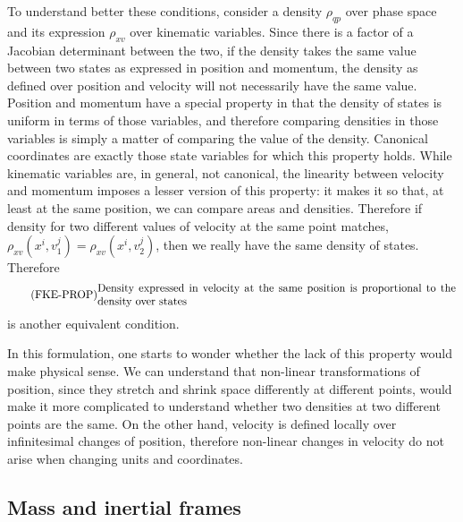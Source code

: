 To understand better these conditions, consider a density $\rho_{qp}$ over phase space and its expression $\rho_{xv}$ over kinematic variables. Since there is a factor of a Jacobian determinant between the two, if the density takes the same value between two states as expressed in position and momentum, the density as defined over position and velocity will not necessarily have the same value. Position and momentum have a special property in that the density of states is uniform in terms of those variables, and therefore comparing densities in those variables is simply a matter of comparing the value of the density. Canonical coordinates are exactly those state variables for which this property holds. While kinematic variables are, in general, not canonical, the linearity between velocity and momentum imposes a lesser version of this property: it makes it so that, at least at the same position, we can compare areas and densities. Therefore if density for two different values of velocity at the same point matches, $\rho_{xv}(x^i, v_1^j) = \rho_{xv}(x^i, v_2^j)$, then we really have the same density of states. Therefore
\begin{equation}
	\tag{FKE-PROP}\label{rp-cm-fke-condDensityVelocity}
	\eqtext{Density expressed in velocity at the same position is proportional to the density over states}
\end{equation}
is another equivalent condition.

In this formulation, one starts to wonder whether the lack of this property would make physical sense. We can understand that non-linear transformations of position, since they stretch and shrink space differently at different points, would make it more complicated to understand whether two densities at two different points are the same. On the other hand, velocity is defined locally over infinitesimal changes of position, therefore non-linear changes in velocity do not arise when changing units and coordinates.

\subsection{Mass and inertial frames}

